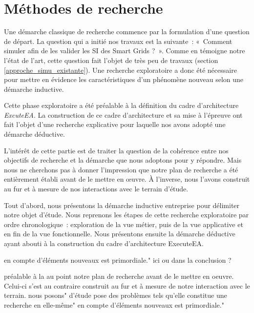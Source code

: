 \section{Méthodes de recherche}
Une démarche classique de recherche commence par la formulation d'une question 
de départ. La question qui a initié nos travaux est la suivante~: «~Comment 
simuler afin de les valider les SI des Smart Grids ?~».  Comme en témoigne notre 
l'état de l'art, cette question fait l'objet de très peu de travaux (section 
\ref{approche_simu_existante}). Une recherche exploratoire a donc été nécessaire 
pour mettre en évidence les caractéristiques d'un phénomène nouveau selon une 
démarche inductive. 

Cette phase exploratoire a été préalable à la définition du cadre d'architecture 
\textit{ExcuteEA}. La construction de ce cadre d'architecture et sa mise à 
l'épreuve ont fait l'objet d'une recherche explicative pour laquelle nos avons 
adopté une démarche déductive.

L'intérêt de cette partie est de traiter la question de la cohérence entre nos 
objectifs de recherche et la démarche que nous adoptons pour y répondre. Mais 
nous ne cherchons pas à donner l'impression que notre plan de recherche a été 
entièrement établi avant de le mettre en œuvre. À l'inverse, nous l'avons 
construit au fur et à mesure de nos interactions avec le terrain d'étude. 

Tout d'abord, nous présentons la démarche inductive entreprise pour délimiter 
notre objet d'étude. Nous reprenons les étapes de cette recherche exploratoire 
par ordre chronologique~: exploration de la vue métier, puis de la vue 
applicative et en fin de la vue fonctionnelle. Nous présentons ensuite la 
démarche déductive ayant abouti à la construction du cadre d'architecture 
ExecuteEA.

en compte d'éléments nouveaux est primordiale." ici ou dans la conclusion ?

préalable à la 
au point notre plan de recherche avant de le mettre en oeuvre. Celui-ci s'est au 
contraire construit au fur et à mesure de notre interaction avec le terrain.
%
nous posons"
d'étude pose des problèmes tels qu'elle constitue une recherche en elle-même"
en compte d'éléments nouveaux est primordiale."


